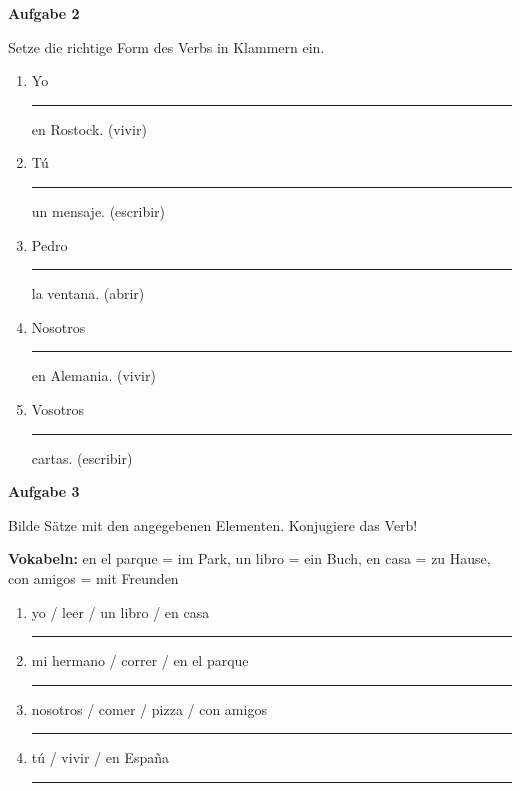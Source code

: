 \documentclass[11pt, a4paper]{article}
\newcommand{\fachfarbe}{spanisch}
\newcommand{\punktebox}[1]{\hfill\fbox{\small \_/#1}}
\newcommand{\luecke}[1]{\rule{#1}{0.4pt}}
\newenvironment{aufgabe}[1]{%
    \needspace{5\baselineskip}%
    \nopagebreak[4]%
    \vspace{10pt}
    \noindent\textbf{\textcolor{\fachfarbe}{Aufgabe #1}}
    \nopagebreak[4]%
    \vspace{5pt}
    \nopagebreak[4]%
    \begin{list}{}{\leftmargin=0pt}
    \item[]
}{%
    \end{list}
}
\begin{document}
\vspace{15pt}


\begin{aufgabe}{2}
Setze die richtige Form des Verbs in Klammern ein. \punktebox{5}
\end{aufgabe}

\begin{enumerate}[label=\alph*)]
    \item Yo \luecke{2.5cm} en Rostock. (vivir)
    \item Tú \luecke{2.5cm} un mensaje. (escribir)
    \item Pedro \luecke{2.5cm} la ventana. (abrir)
    \item Nosotros \luecke{2.5cm} en Alemania. (vivir)
    \item Vosotros \luecke{2.5cm} cartas. (escribir)
\end{enumerate}

\vspace{15pt}


\begin{aufgabe}{3}
Bilde Sätze mit den angegebenen Elementen. Konjugiere das Verb! \punktebox{4}
\end{aufgabe}

\begin{hinweis}
\textbf{Vokabeln:} en el parque = im Park, un libro = ein Buch, en casa = zu Hause, con amigos = mit Freunden
\end{hinweis}

\vspace{0.5em}

\begin{enumerate}[label=\alph*)]
    \item yo / leer / un libro / en casa\\[0.8em]
    \luecke{12cm}

    \item mi hermano / correr / en el parque\\[0.8em]
    \luecke{12cm}

    \item nosotros / comer / pizza / con amigos\\[0.8em]
    \luecke{12cm}

    \item tú / vivir / en España\\[0.8em]
    \luecke{12cm}
\end{enumerate}
\end{document}
